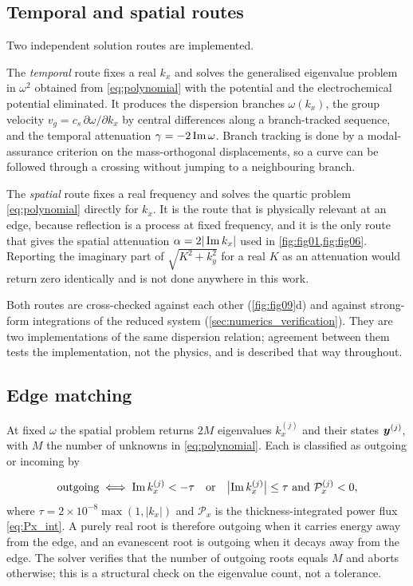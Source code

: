 \subsection{Temporal and spatial routes}
\label{sec:numerics_routes}

Two independent solution routes are implemented.

The \emph{temporal} route fixes a real $k_x$ and solves the generalised
eigenvalue problem in $\omega^2$ obtained from \eqref{eq:polynomial} with the
potential and the electrochemical potential eliminated.  It produces the
dispersion branches $\omega(k_x)$, the group velocity
$v_g=c_s\,\partial\omega/\partial k_x$ by central differences along a
branch-tracked sequence, and the temporal attenuation
$\gamma=-2\operatorname{Im}\omega$.  Branch tracking is done by a modal-assurance
criterion on the mass-orthogonal displacements, so a curve can be followed
through a crossing without jumping to a neighbouring branch.

The \emph{spatial} route fixes a real frequency and solves the quartic problem
\eqref{eq:polynomial} directly for $k_x$.  It is the route that is physically
relevant at an edge, because reflection is a process at fixed frequency, and it
is the only route that gives the spatial attenuation
$\alpha=2|\operatorname{Im} k_x|$ used in \cref{fig:fig01,fig:fig06}.  Reporting the
imaginary part of $\sqrt{K^2+k_y^2}$ for a real $K$ as an attenuation would
return zero identically and is not done anywhere in this work.

Both routes are cross-checked against each other (\cref{fig:fig09}d) and against
strong-form integrations of the reduced system
(\cref{sec:numerics_verification}).  They are two implementations of the same
dispersion relation; agreement between them tests the implementation, not the
physics, and is described that way throughout.

\subsection{Edge matching}
\label{sec:numerics_edge}

At fixed $\omega$ the spatial problem returns $2M$ eigenvalues $k_x^{(j)}$ and
their states $\boldsymbol{y}^{(j)}$, with $M$ the number of unknowns in
\eqref{eq:polynomial}.  Each is classified as outgoing or incoming by

\begin{equation}
\label{eq:classification}
\text{outgoing}\iff
\operatorname{Im} k_x^{(j)}<-\tau
\quad\text{or}\quad
\bigl|\operatorname{Im} k_x^{(j)}\bigr|\le\tau\ \text{and}\ \mathcal{P}_x^{(j)}<0 ,
\end{equation}
where $\tau=2\times10^{-8}\max(1,|k_x|)$ and $\mathcal{P}_x$ is the
thickness-integrated power flux \eqref{eq:Px_int}.  A purely real root is
therefore outgoing when it carries energy away from the edge, and an
evanescent root is outgoing when it decays away from the edge.  The solver
verifies that the number of outgoing roots equals $M$ and aborts otherwise;
this is a structural check on the eigenvalue count, not a tolerance.

